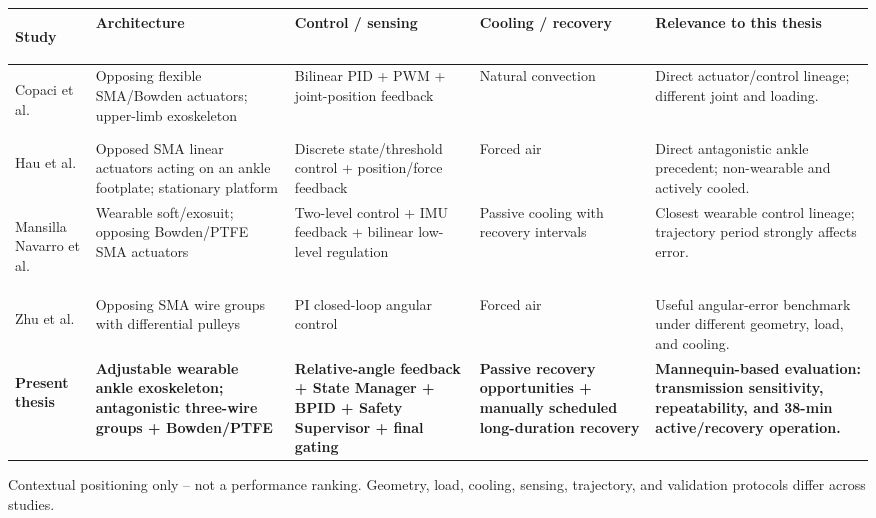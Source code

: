 \documentclass[border=4pt]{standalone}
\begin{document}
\begin{minipage}{24.0cm}
\centering
\setlength{\tabcolsep}{4.5pt}
\renewcommand{\arraystretch}{1.18}
\small

\begin{tabularx}{\linewidth}{
>{\bfseries\raggedright\arraybackslash}p{3.05cm}
>{\raggedright\arraybackslash}p{4.25cm}
>{\raggedright\arraybackslash}p{5.25cm}
>{\raggedright\arraybackslash}p{3.7cm}
>{\raggedright\arraybackslash}X}
\toprule
\rowcolor{archdark}
\color{white}\textbf{Study} &
\color{white}\textbf{Architecture} &
\color{white}\textbf{Control / sensing} &
\color{white}\textbf{Cooling / recovery} &
\color{white}\textbf{Relevance to this thesis} \\
\midrule
Copaci et al. &
Opposing flexible SMA/Bowden actuators; upper-limb exoskeleton &
Bilinear PID + PWM + joint-position feedback &
Natural convection &
Direct actuator/control lineage; different joint and loading. \\

Hau et al. &
Opposed SMA linear actuators acting on an ankle footplate; stationary platform &
Discrete state/threshold control + position/force feedback &
Forced air &
Direct antagonistic ankle precedent; non-wearable and actively cooled. \\

Mansilla Navarro et al. &
Wearable soft/exosuit; opposing Bowden/PTFE SMA actuators &
Two-level control + IMU feedback + bilinear low-level regulation &
Passive cooling with recovery intervals &
Closest wearable control lineage; trajectory period strongly affects error. \\

Zhu et al. &
Opposing SMA wire groups with differential pulleys &
PI closed-loop angular control &
Forced air &
Useful angular-error benchmark under different geometry, load, and cooling. \\

\rowcolor{currentFill}
\textbf{Present thesis} &
\textbf{Adjustable wearable ankle exoskeleton; antagonistic three-wire groups + Bowden/PTFE} &
\textbf{Relative-angle feedback + State Manager + BPID + Safety Supervisor + final gating} &
\textbf{Passive recovery opportunities + manually scheduled long-duration recovery} &
\textbf{Mannequin-based evaluation: transmission sensitivity, repeatability, and 38-min active/recovery operation.} \\
\bottomrule
\end{tabularx}

\vspace{2.5mm}
{\footnotesize\color{archslate}
Contextual positioning only -- not a performance ranking. Geometry, load, cooling, sensing, trajectory, and validation protocols differ across studies.}
\end{minipage}
\end{document}
